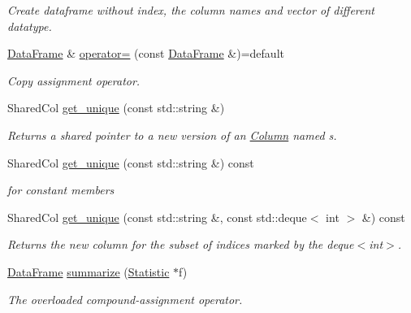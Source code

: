 \begin{DoxyCompactItemize}
\begin{DoxyCompactList}\small\item\em Create dataframe without index, the column names and vector of different datatype. \end{DoxyCompactList}\item 
\hyperlink{classDataFrame}{Data\+Frame} \& \hyperlink{classDataFrame_a26164d4d8119ea34da73eb0c48bd3972}{operator=} (const \hyperlink{classDataFrame}{Data\+Frame} \&)=default
\begin{DoxyCompactList}\small\item\em Copy assignment operator. \end{DoxyCompactList}\item 
Shared\+Col \hyperlink{classDataFrame_a5909652f24e66c22922b4b4c910f2b09}{get\+\_\+unique} (const std\+::string \&)
\begin{DoxyCompactList}\small\item\em Returns a shared pointer to a new version of an \hyperlink{classColumn}{Column} named s. \end{DoxyCompactList}\item 
\mbox{\label{classDataFrame_afa835fbc006732850a6483ba8635db2e}} 
Shared\+Col \hyperlink{classDataFrame_afa835fbc006732850a6483ba8635db2e}{get\+\_\+unique} (const std\+::string \&) const
\begin{DoxyCompactList}\small\item\em for constant members \end{DoxyCompactList}\item 
\mbox{\label{classDataFrame_a4dac2312a688462087cd8c9cbef1c6bb}} 
Shared\+Col \hyperlink{classDataFrame_a4dac2312a688462087cd8c9cbef1c6bb}{get\+\_\+unique} (const std\+::string \&, const std\+::deque$<$ int $>$ \&) const
\begin{DoxyCompactList}\small\item\em Returns the new column for the subset of indices marked by the deque$<$int$>$. \end{DoxyCompactList}\item 
\hyperlink{classDataFrame}{Data\+Frame} \hyperlink{classDataFrame_aa701d85cc361dca2ebdd13d4c6d3d4fd}{summarize} (\hyperlink{classStatistic}{Statistic} $\ast$f)
\begin{DoxyCompactList}\small\item\em The overloaded compound-\/assignment operator. \end{DoxyCompactList}\item 

\end{DoxyCompactItemize}
